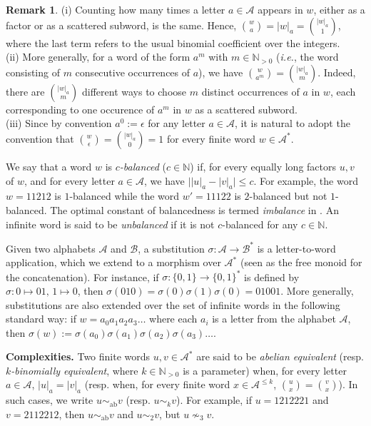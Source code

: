 \documentclass{template_arxiv}
\theoremstyle{definition}
\newtheorem{remark}[lemma]{Remark}
\newcommand{\N}{\mathbb{N}}
\newcommand{\A}{\mathcal{A}}
\newcommand{\B}{\mathcal{B}}
\begin{document}
\begin{remark}\label{rk:binomial_coefficients}
(i) Counting how many times a letter $a\in\A$ appears in $w$, either as a factor or as a scattered subword, is the same. Hence, $\binom{w}{a}=|w|_a=\binom{|w|_a}{1}$, where the last term refers to the usual binomial coefficient over the integers.\\
(ii) More generally, for a word of the form $a^m$ with $m\in\N_{>0}$ (\emph{i.e.}, the word consisting of $m$ consecutive occurrences of $a$), we have $\binom{w}{a^m}=\binom{|w|_a}{m}$. Indeed, there are $\binom{|w|_a}{m}$ different ways to choose $m$ distinct occurrences of $a$ in $w$, each corresponding to one occurence of $a^m$ in $w$ as a scattered subword.\\
(iii) Since by convention $a^0:=\epsilon$ for any letter $a\in\A$, it is natural to adopt the convention that $\binom{w}{\epsilon}=\binom{|w|_a}{0}=1$ for every finite word $w\in\A^*$.
\end{remark}

We say that a word $w$ is \emph{$c$-balanced} ($c\in\N$) if, for every equally long factors $u,v$ of $w$, and for every letter $a\in\A$, we have $\big||u|_a-|v|_a\big|\leq c$. For example, the word $w=11212$ is $1$-balanced while the word $w'=11122$ is $2$-balanced but not $1$-balanced. The optimal constant of balancedness is termed \emph{imbalance} in \cite{AndPhD,And21,AV22,AV23,AV24}. An infinite word is said to be \emph{unbalanced} if it is not $c$-balanced for any $c\in\N$.

Given two alphabets $\A$ and $\B$, a substitution $\sigma:\A\to\B^*$ is a letter-to-word application, which we extend to a morphism over $\A^*$ (seen as the free monoid for the concatenation). For instance, if $\sigma:\{0,1\}\to\{0,1\}^*$ is defined by $\sigma:0\mapsto 01,\,1\mapsto 0$, then $\sigma(010)=\sigma(0)\sigma(1)\sigma(0)=01001$. More generally, substitutions are also extended over the set of infinite words in the following standard way: if $w=a_0a_1a_2a_3\ldots$ where each $a_i$ is a letter from the alphabet $\A$, then $\sigma(w):=\sigma(a_0)\sigma(a_1)\sigma(a_2)\sigma(a_3)\ldots$.

\bigskip

\noindent\textbf{Complexities.} Two finite words $u,v\in\A^*$ are said to be \emph{abelian equivalent} (resp. \emph{$k$-binomially equivalent}, where $k\in\N_{>0}$ is a parameter) when, for every letter $a\in\A$, $|u|_a=|v|_a$ (resp. when, for every finite word $x\in\A^{\leq k}$, $\binom{u}{x}=\binom{v}{x}$). In such cases, we write $u\sim_{\text{ab}}v$ (resp. $u\sim_{k}v$). For example, if $u=1212221$ and $v=2112212$, then $u\sim_{\text{ab}}v$ and $u\sim_{2}v$, but $u\nsim_{3}v$.
\end{document}
